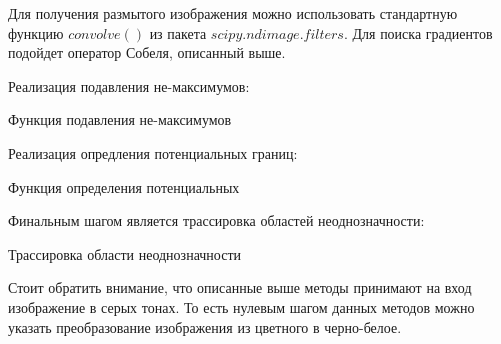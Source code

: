 Для получения размытого изображения можно использовать стандартную функцию $convolve()$ из пакета $scipy.ndimage.filters$. Для поиска градиентов подойдет оператор Собеля, описанный выше. 

Реализация подавления не-максимумов:

\begin{minipage}{0.75\textwidth}
	\begin{algorithm}[H]
		
		\caption{Функция подавления не-максимумов}
		\label{imp:canny-non-max}
	\end{algorithm}
\end{minipage}

Реализация опредления потенциальных границ:

\begin{minipage}{0.75\textwidth}
	\begin{algorithm}[H]
		
		\caption{Функция определения потенциальных}
		\label{imp:canny-threholding}
	\end{algorithm}
\end{minipage}

Финальным шагом является трассировка областей неоднозначности:

\begin{minipage}{0.75\textwidth}
	\begin{algorithm}[H]
		
		\caption{Трассировка области неоднозначности}
		\label{imp:canny-hysteresis}
	\end{algorithm}
\end{minipage}

Стоит обратить внимание, что описанные выше методы принимают на вход изображение в серых тонах. То есть нулевым шагом данных методов можно указать преобразование изображения из цветного в черно-белое.
